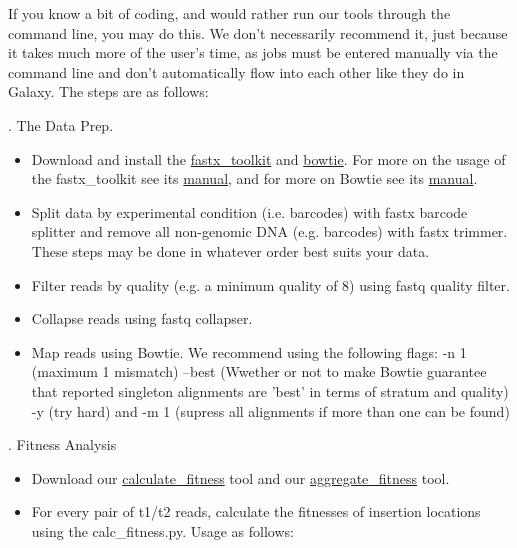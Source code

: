 \documentclass{article}
\begin{document}
\noindent
If you know a bit of coding, and would rather run our tools through the command line, you may do this. We don't necessarily recommend it, just because it takes much more of the user's time, as jobs must be entered manually via the command line and don't automatically flow into each other like they do in Galaxy. The steps are as follows: 

\vspace{5 mm}

. The Data Prep.

\begin{itemize}

\item Download and install the \href{http://hannonlab.cshl.edu/fastx_toolkit/}{fastx\_toolkit} and  \href{http://bowtie-bio.sourceforge.net/index.shtml}{bowtie}. For more on the usage of the fastx\_toolkit see its \href{http://hannonlab.cshl.edu/fastx_toolkit/commandline.html}{manual}, and for more on Bowtie see its \href{http://bowtie-bio.sourceforge.net/manual.shtml}{manual}.
\item Split data by experimental condition (i.e. barcodes) with fastx barcode splitter and remove all non-genomic DNA (e.g. barcodes) with fastx trimmer. These steps may be done in whatever order best suits your data.
\item Filter reads by quality (e.g. a minimum quality of 8) using fastq quality filter.
\item Collapse reads using fastq collapser.
\item Map reads using Bowtie. We recommend using the following flags: -n 1 (maximum 1 mismatch) --best (Wwether or not to make Bowtie guarantee that reported singleton alignments are 'best' in terms of stratum and quality) -y (try hard) and -m 1 (supress all alignments if more than one can be found)

\end{itemize}

\vspace{5 mm}

. Fitness Analysis

\begin{itemize}

\item Download our \href{https://github.com/vanOpijnenLab/magenta-p2/blob/master/tools/Calculate%20Fitnesses/calc_fitness.py}{calculate\_fitness} tool and our \href{https://github.com/vanOpijnenLab/magenta-p2/blob/master/tools/Aggregate%20Fitnesses/aggregate.py}{aggregate\_fitness} tool. 
\item For every pair of t1/t2 reads, calculate the fitnesses of insertion locations using the calc\_fitness.py. Usage as follows:

\end{itemize}
\end{document}
